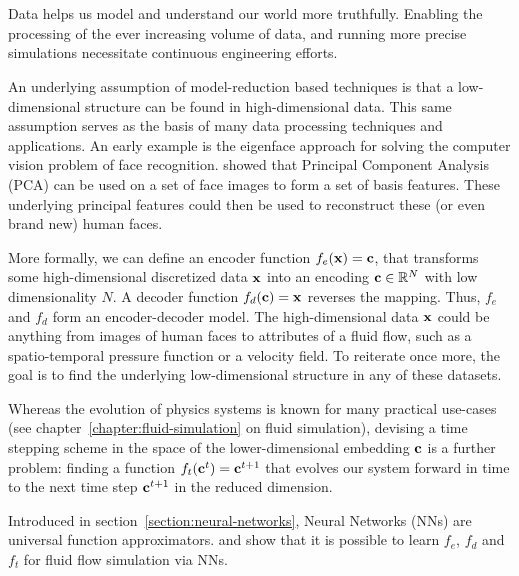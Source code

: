 \chapter{\bevezetes}

Data helps us model and understand our world more truthfully. Enabling the
processing of the ever increasing volume of data, and running more precise
simulations necessitate continuous engineering efforts.

An underlying assumption of model-reduction based techniques is that
a low-dimensional structure can be found in high-dimensional data. This same
assumption serves as the basis of many data processing techniques and
applications. An early example is the eigenface approach for solving the
computer vision problem of face recognition. \citet{eigenface1987} showed that
Principal Component Analysis (PCA) can be used on a set of face images to form
a set of basis features. These underlying principal features could then be used
to reconstruct these (or even brand new) human faces.

More formally, we can define an encoder function $f_e(\vb{x}) = \vb{c}$, that
transforms some high-dimensional discretized data $\vb{x}$ into an encoding
$\vb{c} \in \mathbb{R}^{N}$ with low dimensionality $N$. A decoder function
$f_d(\vb{c}) = \vb{x}$ reverses the mapping. Thus, $f_e$ and $f_d$ form an
encoder-decoder model. The high-dimensional data $\vb{x}$ could be anything from
images of human faces to attributes of a fluid flow, such as a spatio-temporal
pressure function or a velocity field. To reiterate once more, the goal is to
find the underlying low-dimensional structure in any of these datasets.

Whereas the evolution of physics systems is known for many practical
use-cases (see
chapter~\ref{chapter:fluid-simulation} on fluid simulation), devising a time
stepping scheme in the space of the lower-dimensional embedding $\vb{c}$ is
a further problem: finding a function $f_t(\vb{c}^t) = \vb{c}^{t+1}$ that
evolves our system forward in time to the next time step $\vb{c}^{t+1}$ in the
reduced dimension.

Introduced in section~\ref{section:neural-networks}, Neural Networks (NNs) are
universal function approximators.  \citet{LatentSpaceSubdivision} and
\citet{Wiewel2019LatentSP} show that it is possible to learn $f_e$, $f_d$ and
$f_t$ for fluid flow simulation via NNs.

